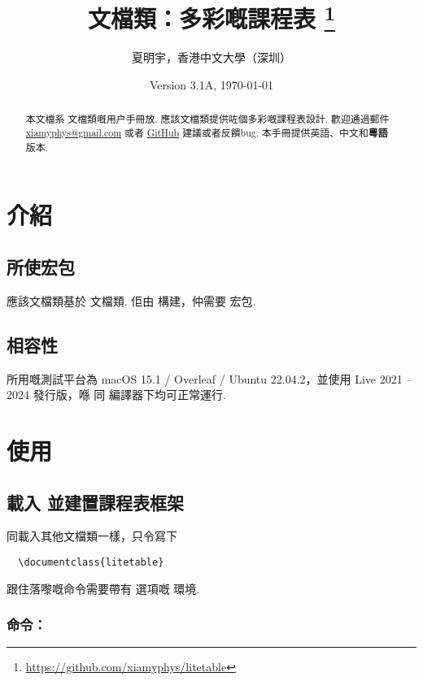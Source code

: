 \documentclass[letterpaper]{l3doc}
\title
{
  \cls{litetable} 文檔類：多彩嘅課程表
  \thanks{\url{https://github.com/xiamyphys/litetable}}
}
\author{夏明宇，香港中文大學（深圳）}
\affil{\href{mailto:xiamyphys@gmail.com}{xiamyphys@gmail.com}}
\date{Version 3.1A, \today}
\begin{document}
\maketitle

\begin{abstract}
  本文檔系  文檔類嘅用户手冊放. 應該文檔類提供咗個多彩嘅課程表設計. 歡迎通過郵件 \href{mailto:xiamyphys@gmail.com}{xiamyphys@gmail.com} 或者 \href{https://github.com/xiamyphys/litetable/issues}{GitHub} 建議或者反饋bug. 本手冊提供英語、中文和\textbf{粵語}版本.
\end{abstract}

\section{介紹}

\subsection{所使宏包}

應該文檔類基於  文檔類. 佢由  構建，仲需要  宏包. 

\subsection{相容性}

所用嘅測試平台為 macOS 15.1 / Overleaf / Ubuntu 22.04.2，並使用 Live 2021 -- 2024 發行版，喺  同  編譯器下均可正常運行.

\section{使用}

\subsection{載入  並建置課程表框架}

同載入其他文檔類一樣，只令寫下

\begin{Verbatim}
  \documentclass{litetable}
\end{Verbatim}

跟住落嚟嘅命令需要帶有  選項嘅  環境.

\subsubsection{命令：}
\end{document}

